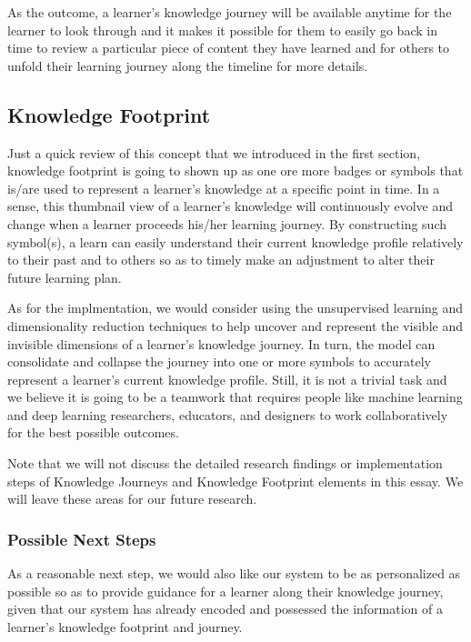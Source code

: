 \documentclass{acm_proc_article-sp}
\begin{document}
As the outcome, a learner's knowledge journey will be available anytime
for the learner to look through and it makes it possible for them to
easily go back in time to review a particular piece of content they have
learned and for others to unfold their learning journey along the
timeline for more details.

\subsection{Knowledge Footprint}\label{knowledge-footprint-1}

Just a quick review of this concept that we introduced in the first
section, knowledge footprint is going to shown up as one ore more badges
or symbols that is/are used to represent a learner's knowledge at a
specific point in time. In a sense, this thumbnail view of a learner's
knowledge will continuously evolve and change when a learner proceeds
his/her learning journey. By constructing such symbol(s), a learn can
easily understand their current knowledge profile relatively to their
past and to others so as to timely make an adjustment to alter their
future learning plan.

As for the implmentation, we would consider using the unsupervised
learning and dimensionality reduction techniques to help uncover and
represent the visible and invisible dimensions of a learner's knowledge
journey. In turn, the model can consolidate and collapse the journey
into one or more symbols to accurately represent a learner's current
knowledge profile. Still, it is not a trivial task and we believe it is
going to be a teamwork that requires people like machine learning and
deep learning researchers, educators, and designers to work
collaboratively for the best possible outcomes.

Note that we will not discuss the detailed research findings or
implementation steps of Knowledge Journeys and Knowledge Footprint
elements in this essay. We will leave these areas for our future
research.

\subsubsection{Possible Next Steps}\label{possible-next-steps}

As a reasonable next step, we would also like our system to be as
personalized as possible so as to provide guidance for a learner along
their knowledge journey, given that our system has already encoded and
possessed the information of a learner's knowledge footprint and
journey.
\end{document}
